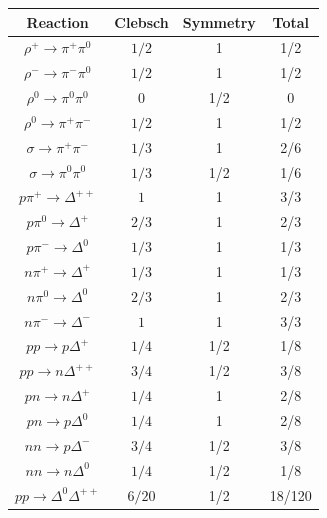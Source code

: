 \begin{table}
\begin{tabular}{cccc}
  \toprule
  Reaction                           &   Clebsch       &  Symmetry  &   Total \\
  \midrule
  $\rho^+\to\pi^+\pi^0$              &  $      1/2$  &     1      &   1/2     \\
  $\rho^-\to\pi^-\pi^0$              &  $      1/2$  &     1      &   1/2     \\
  $\rho^0\to\pi^0\pi^0$              &          $0$  &   1/2      &   0       \\
  $\rho^0\to\pi^+\pi^-$              &  $      1/2$  &     1      &   1/2     \\
  \midrule
  $\sigma\to\pi^+\pi^-$              &  $      1/3$  &     1      &   2/6     \\
  $\sigma\to\pi^0\pi^0$              &  $      1/3$  &   1/2      &   1/6     \\
  \midrule
  $p\pi^+\to\Delta^{++}$             &          $1$  &     1      &   3/3     \\
  $p\pi^0\to\Delta^{+}$              &  $      2/3$  &     1      &   2/3     \\
  $p\pi^-\to\Delta^{0}$              &  $      1/3$  &     1      &   1/3     \\
  $n\pi^+\to\Delta^{+}$              &  $      1/3$  &     1      &   1/3     \\
  $n\pi^0\to\Delta^{0}$              &  $      2/3$  &     1      &   2/3     \\
  $n\pi^-\to\Delta^{-}$              &          $1$  &     1      &   3/3     \\
  \midrule
  $pp\to p\Delta^{+}$                &  $      1/4$  &   1/2      &  1/8      \\
  $pp\to n\Delta^{++}$               &  $      3/4$  &   1/2      &  3/8      \\
  $pn\to n\Delta^{+}$                &  $      1/4$  &     1      &  2/8      \\
  $pn\to p\Delta^{0}$                &  $      1/4$  &     1      &  2/8      \\
  $nn\to p\Delta^{-}$                &  $      3/4$  &   1/2      &  3/8      \\
  $nn\to n\Delta^{0}$                &  $      1/4$  &   1/2      &  1/8      \\
  \midrule
  $pp\to\Delta^{0}\Delta^{++}$       &  $      6/20$ &   1/2      &  18/120   \\

\end{tabular}
\end{table}
